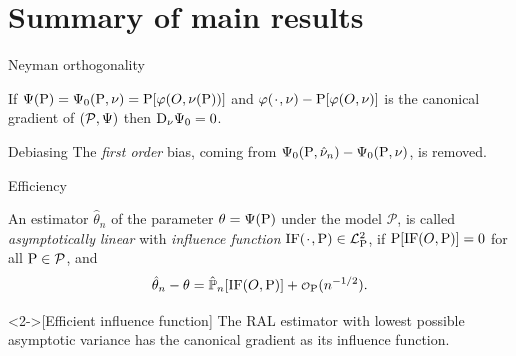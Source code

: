 \documentclass{beamer}\usepackage{listings}
\begin{document}
\section{Summary of main results}
\label{sec:org0a1f9ac}
\begin{frame}[label={sec:org25df887}]{Neyman orthogonality}
\begin{theorem}
If $\TT(\P) = \TT_0(\P, \nu) = \P[\phi(O, \nu(\P))]$ and $\phi(\blank, \nu) - \P[\phi(O, \nu)]$ is the
canonical gradient of $(\mathcal{P}, \TT)$ then $\mathrm{D_{\nu}{\TT_0}} = 0$.

\hfill \pause
\end{theorem}

\begin{block}{Debiasing}
The \emph{first order} bias, coming from \(\TT_0(\P, \hat{\nu}_n) - \TT_0(\P, \nu)\), is removed. 
\end{block}
\end{frame}

\begin{frame}[label={sec:org327e82d}]{Efficiency}
\begin{definition}
An estimator $\hat{\theta}_n$ of the parameter $\theta = \TT(\P)$ under the model $\mathcal{P}$, is
called \textit{asymptotically linear} with \textit{influence function} $\ic(\blank, \P) \in \lp$, if 
$\P[\ic(O, \P)] = 0$ for all $\P \in \mathcal{P}$, and 
\begin{equation*}
  \hat{\theta}_n - \theta = \empmeas[\ic(O, \P)] + \smallO_{\P}(n^{-1/2}).
\end{equation*}
\end{definition}

\begin{theorem}<2->[Efficient influence function]
The RAL estimator with lowest possible asymptotic variance has the canonical gradient as its
influence function.
\end{theorem}
\end{frame}
\end{document}
